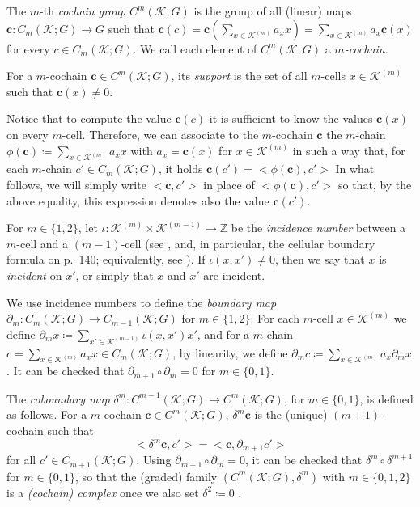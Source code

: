 \documentclass[a4paper,twoside,10pt]{article}
\theoremstyle{plain}
\theoremstyle{definition}
\theoremstyle{remark}
\newcommand{\mc}{\mathcal}
\newcommand{\Z}{\mathbb{Z}}
\newcommand{\K}{\mc{K}}
\newcommand{\inner}[2]{< #1,#2>}
\newcommand{\cochain}[1]{\mathbf #1}
\begin{document}
The $m$-th \emph{cochain group} $C^m(\K;G)$ is the group of all (linear) maps $\cochain c : C_m(\K;G) \to G$ such that $\cochain c(c) = \cochain c (\sum_{x \in \K^{(m)}} a_x x) = \sum_{x \in \K^{(m)}} a_x \cochain c(x)$ for every $c \in C_m(\K;G)$.
We call each element of $C^m(\K;G)$ a \emph{$m$-cochain}.

For a $m$-cochain $\cochain c \in C^m(\K;G)$, its \emph{support} is the set of all $m$-cells $x \in \K^{(m)}$ such that $\cochain c(x) \neq 0$.

Notice that to compute the value $\cochain c(c)$ it is sufficient to know the values $\cochain c(x)$ on every $m$-cell.
Therefore, we can associate to the $m$-cochain $\cochain c$ the $m$-chain $\phi(\cochain c) \coloneqq \sum_{x \in \K^{(m)}} a_x x$ with $a_x = \cochain c(x)$ for $x \in \K^{(m)}$ in such a way that, for each $m$-chain $c' \in C_m(\K;G)$, it holds
$
    \cochain c(c') = \inner{\phi(\cochain c)}{c'}
$
In what follows, we will simply write $\inner{\cochain c}{c'}$ in place of $\inner{\phi(\cochain c)}{c'}$ so that, by the above equality, this expression denotes also the value $ \cochain c(c')$.

For $m \in \{1,2\}$, let $\iota : \K^{(m)} \times \K^{(m-1)} \to \Z$ be the \emph{incidence number} between a $m$-cell and a $(m-1)$-cell (see \cite[Section 2.2]{hatcher}, and, in particular, the cellular boundary formula on p.\ 140; equivalently, see \cite{cooke2015homology}).
If $\iota(x, x') \neq 0$, then we say that $x$ is \emph{incident} on $x'$, or simply that $x$ and $x'$ are incident.

We use incidence numbers to define the \emph{boundary map} $\partial_m : C_m(\K;G) \to C_{m-1}(\K;G)$ for $m \in \{1,2\}$.
For each $m$-cell $x \in \K^{(m)}$ we define $\partial_m x \coloneqq \sum_{x' \in \K^{(m-1)}} \iota(x,x') x'$, and for a $m$-chain $c = \sum_{x \in \K^{(m)}} a_x x \in C_m(\K;G)$, by linearity, we define $\partial_m c \coloneqq \sum_{x \in \K^{(m)}} a_x \partial_m x$.
It can be checked that $\partial_{m+1} \circ \partial_{m} = 0$ for $m \in \{0,1\}$.

The \emph{coboundary map} $\delta^m : C^{m-1}(\K;G) \to C^{m}(\K;G)$, for $m \in \{0,1\}$, is defined as follows.
For a $m$-cochain $\cochain c \in C^{m}(\K;G)$, $\delta^m \cochain c$ is the (unique) $(m+1)$-cochain such that
\[
\inner{\delta^m \cochain c}{ c'} = \inner{\cochain c}{\partial_{m+1} c'}
\]
for all $c' \in C_{m+1}(\K;G)$.
Using $\partial_{m+1} \circ \partial_{m} = 0$, it can be checked that $\delta^m \circ \delta^{m+1}$ for $m \in \{0,1\}$, so that the (graded) family $(C^m(\K;G), \delta^m)$ with $m \in \{0,1,2\}$ is a \emph{(cochain) complex} once we also set $\delta^2 \coloneqq 0$ \cite{arnold2018finite}.
\end{document}
